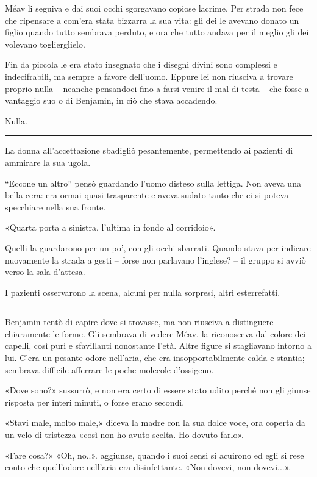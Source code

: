 \documentclass[a4paper,10pt]{memoir}
\begin{document}
Méav li seguiva e dai suoi occhi sgorgavano copiose lacrime. Per strada non fece che ripensare a com'era stata bizzarra
la sua vita: gli dei le avevano donato un figlio quando tutto sembrava perduto, e ora che tutto andava per il meglio gli
dei volevano toglierglielo.

Fin da piccola le era stato insegnato che i disegni divini sono complessi e indecifrabili, ma sempre a favore dell'uomo.
Eppure lei non riusciva a trovare proprio nulla -- neanche pensandoci fino a farsi venire il mal di testa -- che fosse a
vantaggio suo o di Benjamin, in ciò che stava accadendo.

Nulla.

\plainbreak{1}

La donna all'accettazione sbadigliò pesantemente, permettendo ai pazienti di
ammirare la sua ugola.

``Eccone un altro'' pensò guardando l'uomo disteso sulla lettiga. Non aveva una bella cera: era ormai quasi trasparente
e aveva sudato tanto che ci si poteva specchiare nella sua fronte.

«Quarta porta a sinistra, l'ultima in fondo al corridoio».

Quelli la guardarono per un po', con gli occhi sbarrati. Quando stava per indicare nuovamente la strada a gesti -- forse
non parlavano l'inglese? -- il gruppo si avviò verso la sala d'attesa.

I pazienti osservarono la scena, alcuni per nulla sorpresi, altri esterrefatti.

\plainbreak{1}

Benjamin tentò di capire dove si trovasse, ma non riusciva a distinguere chiaramente le forme. Gli sembrava di vedere
Méav, la riconosceva dal colore dei capelli, così puri e sfavillanti nonostante l'età. Altre figure si stagliavano
intorno a lui. C'era un pesante odore nell'aria, che era insopportabilmente calda e stantia; sembrava difficile
afferrare le poche molecole d'ossigeno.

«Dove sono?» sussurrò, e non era certo di essere stato udito perché non gli giunse risposta per interi minuti, o forse
erano secondi.

«Stavi male, molto male,» diceva la madre con la sua dolce voce, ora coperta da un velo di tristezza «così non ho avuto
scelta. Ho dovuto farlo».

«Fare cosa?» «Oh, no..». aggiunse, quando i suoi sensi si acuirono ed egli si rese conto che quell'odore nell'aria era
disinfettante. «Non dovevi, non dovevi...».
\end{document}
